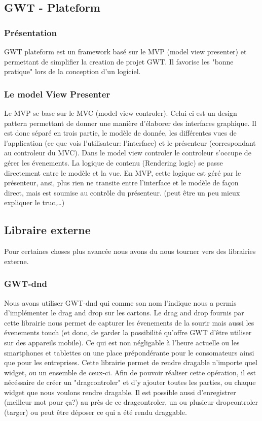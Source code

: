 \subsection{GWT - Plateform}

\subsubsection{Présentation}

GWT plateform est un framework basé sur le MVP (model view presenter) et permettant de simplifier la creation de projet GWT. Il favorise les "bonne pratique" lors de la conception d'un logiciel.
	
\subsubsection{Le model View Presenter}
Le MVP se base sur le MVC (model view controler). Celui-ci est un design pattern permettant de donner une manière d'élaborer des interfaces graphique. Il est donc séparé en trois partie, le modèle de donnée, les différentes vues de l'application (ce que vois l'utilisateur: l'interface) et le présenteur (correspondant au controleur du MVC). Dans le model view controler le controleur s'occupe de gérer les évenements. La logique de contenu (Rendering logic) se passe directement entre le modèle et la vue. En MVP, cette logique est géré par le présenteur, ansi, plus rien ne transite entre l'interface et le modèle de façon direct, mais est soumise au contrôle du présenteur. (peut être un peu mieux expliquer le truc,…)

\subsection{Libraire externe}
Pour certaines choses plus avancée nous avons du nous tourner vers des librairies externe. 
\subsubsection{GWT-dnd}
Nous avons utiliser GWT-dnd qui comme son nom l'indique nous a permis
d'implémenter le drag and drop sur les cartons. Le drag and drop fournis par
cette librairie nous permet de capturer les évenements de la sourir mais aussi les évenements touch (et donc, de garder la possibilité qu'offre GWT d'être utiliser sur des appareils mobile). Ce qui est non négligable à l'heure actuelle ou les smartphones et tablettes on une place prépondérante pour le consomateurs ainsi que pour les entreprises. Cette librairie permet de rendre dragable n'importe quel widget, ou un ensemble de ceux-ci. Afin de pouvoir réaliser cette opération, il est nécéssaire de créer un "dragcontroler" et d'y ajouter toutes les parties, ou chaque widget que nous voulons rendre dragable. Il est possible aussi d'enregistrer (meilleur mot pour ça?) au près de ce dragcontroler, un ou plusieur dropcontroler (targer) ou peut être déposer ce qui a été rendu draggable.

